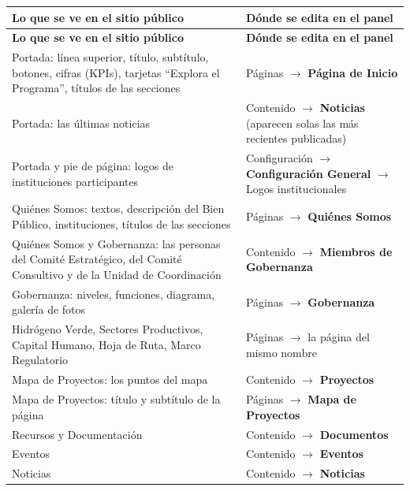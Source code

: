 \documentclass[11pt,letterpaper]{report}
\begin{document}
\begin{longtable}{>{\raggedright\arraybackslash}p{}>{\raggedright\arraybackslash}p{}}
\rowcolor{h2vazul}\textbf{\color{white}Lo que se ve en el sitio público} & \textbf{\color{white}Dónde se edita en el panel} \\
\endfirsthead
\rowcolor{h2vazul}\textbf{\color{white}Lo que se ve en el sitio público} & \textbf{\color{white}Dónde se edita en el panel} \\
\endhead
Portada: línea superior, título, subtítulo, botones, cifras (KPIs), tarjetas “Explora el Programa”, títulos de las secciones & Páginas $\rightarrow$ \textbf{Página de Inicio} \\ \midrule
\rowcolor{filaalt}Portada: las últimas noticias & Contenido $\rightarrow$ \textbf{Noticias} (aparecen solas las más recientes publicadas) \\ \midrule
Portada y pie de página: logos de instituciones participantes & Configuración $\rightarrow$ \textbf{Configuración General} $\rightarrow$ Logos institucionales \\ \midrule
\rowcolor{filaalt}Quiénes Somos: textos, descripción del Bien Público, instituciones, títulos de las secciones & Páginas $\rightarrow$ \textbf{Quiénes Somos} \\ \midrule
Quiénes Somos y Gobernanza: las personas del Comité Estratégico, del Comité Consultivo y de la Unidad de Coordinación & Contenido $\rightarrow$ \textbf{Miembros de Gobernanza} \\ \midrule
\rowcolor{filaalt}Gobernanza: niveles, funciones, diagrama, galería de fotos & Páginas $\rightarrow$ \textbf{Gobernanza} \\ \midrule
Hidrógeno Verde, Sectores Productivos, Capital Humano, Hoja de Ruta, Marco Regulatorio & Páginas $\rightarrow$ la página del mismo nombre \\ \midrule
\rowcolor{filaalt}Mapa de Proyectos: los puntos del mapa & Contenido $\rightarrow$ \textbf{Proyectos} \\ \midrule
Mapa de Proyectos: título y subtítulo de la página & Páginas $\rightarrow$ \textbf{Mapa de Proyectos} \\ \midrule
\rowcolor{filaalt}Recursos y Documentación & Contenido $\rightarrow$ \textbf{Documentos} \\ \midrule
Eventos & Contenido $\rightarrow$ \textbf{Eventos} \\ \midrule
\rowcolor{filaalt}Noticias & Contenido $\rightarrow$ \textbf{Noticias} \\ \midrule

\end{longtable}
\end{document}
